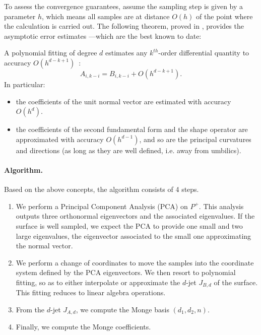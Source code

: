 To assess the convergence guarantees, assume the sampling step is
given by a parameter $h$, which means all samples are at distance
$O(h)$ of the point where the calculation is carried out.
The following theorem, proved in \cite{cgal:cp-edqpf-05}, provides the
asymptotic error estimates ---which are the best known to date:

\begin{theorem}
A polynomial fitting of degree $d$ estimates any $k^{th}$-order
differential quantity to accuracy $O(h^{d-k+1})$~:
\begin{equation}
A_{i,k-i} = B_{i,k-i} +O(h^{d-k+1}).
\end{equation}
%
In particular:
\begin{itemize}
\item 
the coefficients of the unit normal vector are estimated with accuracy
$O(h^d)$.
\item 
the coefficients of the second fundamental form and the shape 
operator are approximated with accuracy $O(h^{d-1})$, and so are the
principal curvatures and directions (as long as they are well defined,
i.e. away from umbilics).
\end{itemize}
\end{theorem}

\paragraph{Algorithm.}
%
Based on the above concepts, the algorithm consists of 4 steps.
%
\begin{enumerate}
\item
We perform a Principal Component Analysis (PCA) on $P^+$. This
analysis outputs three orthonormal eigenvectors and the associated
eigenvalues.  If the surface is well sampled, we expect the PCA to
provide one small and two large eigenvalues, the eigenvector
associated to the small one approximating the normal vector.
\item
We perform a change of coordinates to move the samples into the
coordinate system defined by the PCA eigenvectors. We then resort to
polynomial fitting, so as to either interpolate or approximate the
$d$-jet $J_{B,d}$ of the surface. This fitting reduces to linear
algebra operations.
\item
From the $d$-jet $J_{A,d}$, we compute the Monge basis $(d_1,d_2,n)$.
\item
Finally, we compute the Monge coefficients.

\end{enumerate}


